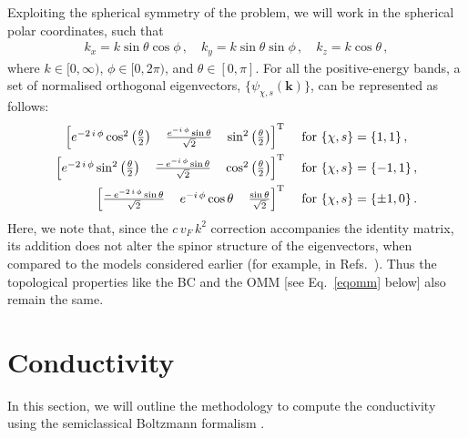 \documentclass[aps,prb,onecolumn,nofootinbib,citeautoscript,10pt]{revtex4-2}
\def \nn{\nonumber \\}
\begin{document}
Exploiting the spherical symmetry of the problem, we will work in the spherical polar coordinates, such that
\begin{align}
\label{eqcyln} 
k_x =  k \sin \theta  \cos \phi \,, \quad
k_y =   k \sin \theta  \sin \phi \,, \quad k_z = k \cos \theta\,,
\end{align}
where $ k \in [0, \infty )$, $\phi \in [0, 2 \pi )$, and $\theta \in [0, \pi ]$. 
For all the positive-energy bands, a set of normalised orthogonal eigenvectors, $ \lbrace \psi_{\chi, s} (\boldsymbol k) \rbrace $, can be represented as follows:
\begin{align}
\label{eqev}
 \begin{bmatrix}
e^{-2\, i\, \phi } \cos ^2\left(\frac{\theta }{2}\right) &
\,\frac{e^{-i \,\phi } \sin \theta } {\sqrt{2}} &
\,\sin ^2\left(\frac{\theta}{2}\right) 
\end{bmatrix}^{\rm T} &  \quad \text{ for } 
   \{\chi , s\} = \{1, 1\} \,,
\nn \begin{bmatrix}
e^{-2 \,i\, \phi } \sin ^2\left(\frac{\theta }{2}\right) &
\,\frac{ -\, e^{-i\, \phi } \sin \theta } {\sqrt{2}} &
\, \cos ^2\left(\frac{\theta }{2}\right)
\end{bmatrix}^{\rm T} 
& \quad \text{ for }   \{\chi , s\} = \{ -1, 1\} \,,
\nn \begin{bmatrix}
\frac{ -\, e^{-2 \,i\, \phi } \sin \theta } {\sqrt{2}} &
\, e^{-i \, \phi } \cos \theta &
\,\frac{\sin \theta } {\sqrt{2}}
\end{bmatrix}^{\rm T} 
&  \quad \text{ for }
   \{\chi , s\} = \{ \pm 1,  0 \} \,.
\end{align} 
Here, we note that, since the $c \,v_F \,  k^2$ correction accompanies the identity matrix, its addition does not alter the spinor structure of the eigenvectors, when compared to the models considered earlier (for example, in Refs.~\cite{ips-spin1-ph, grushin-multifold}). Thus the topological properties like the BC and the OMM [see Eq.~\eqref{eqomm} below] also remain the same.


\section{Conductivity}
\label{secboltz}



In this section, we will outline the methodology to compute the conductivity using the semiclassical Boltzmann formalism \cite{mermin, sundaram99_wavepacket, li2023_planar, ips-kush-review, ips-rsw-ph, ips-shreya, timm}.
\end{document}
